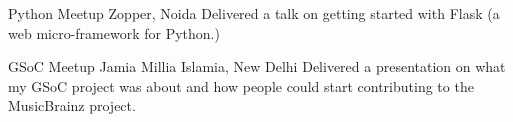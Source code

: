     {Python Meetup}
    {}
    {Zopper, Noida}
    {}
    {
        Delivered a talk on getting started with Flask (a web micro-framework for Python.)
    }
    \vspace*{0.2\baselineskip}

    {GSoC Meetup}
    {}
    {Jamia Millia Islamia, New Delhi}
    {}
    {
        Delivered a presentation on what my GSoC project was about and how people could
        start contributing to the MusicBrainz project.
    }
    \vspace*{0.2\baselineskip}
